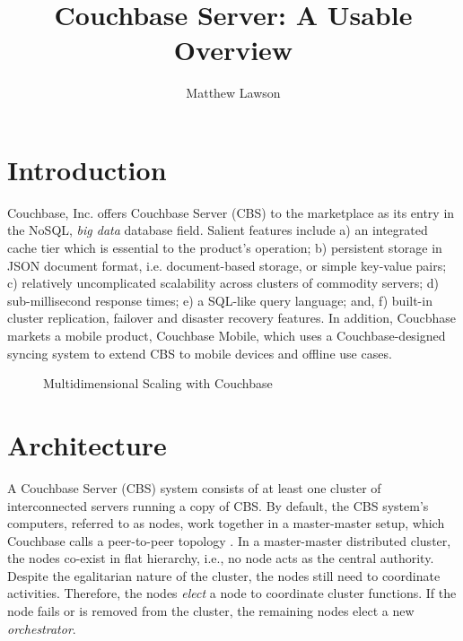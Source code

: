 \documentclass[9pt,twocolumn,twoside]{../../styles/osajnl}
\title{Couchbase Server: A Usable Overview}
\author[1]{Matthew Lawson}
\affil[1]{School of Informatics and Computing, Bloomington, IN 47408, U.S.A.}
\affil[*]{Corresponding authors: laszewski@gmail.com}
\begin{document}
\maketitle

\section{Introduction}

Couchbase, Inc. offers Couchbase Server (CBS) to the marketplace as its entry in the NoSQL, \textit{big data} database field.  Salient features include a) an integrated cache tier which is essential to the product's operation; b) persistent storage in JSON document format, i.e. document-based storage, or simple key-value pairs; c) relatively uncomplicated scalability across clusters of commodity servers; d) sub-millisecond response times; e) a SQL-like query language; and, f) built-in cluster replication, failover and disaster recovery features.  In addition, Coucbhase markets a mobile product, Couchbase Mobile, which uses a Couchbase-designed syncing system to extend CBS to mobile devices and offline use cases.

\begin{figure}[htbp]
\centering
{}
\caption{Multidimensional Scaling with Couchbase \cite{www-components-cbsinc}}
\label{fig:multidim scaling}
\end{figure}

\section{Architecture} 

A Couchbase Server (CBS) system consists of at
least one cluster of interconnected servers running a copy of CBS. By
default, the CBS system's computers, referred to as nodes, work together in a master-master setup, which Couchbase calls a peer-to-peer topology \cite{www-components-cbsinc}.  In a master-master distributed cluster, the nodes co-exist in flat hierarchy, i.e., no node acts as the central authority.  Despite the egalitarian nature of the cluster, the nodes still need to coordinate activities.  Therefore, the nodes \textit{elect} a node to coordinate cluster functions. If the node fails or is removed from the cluster, the remaining  nodes elect a new \textit{orchestrator}.
\end{document}
